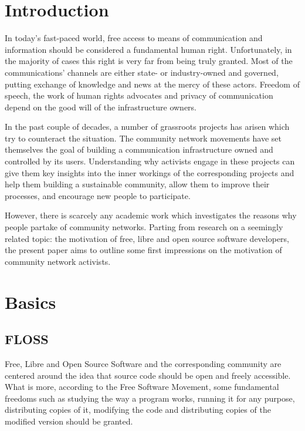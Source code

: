 \documentclass{scrartcl}
\begin{document}
\newpage
\section{Introduction}

In today's fast-paced world, free access to means of communication and information should be considered a fundamental human right.
Unfortunately, in the majority of cases this right is very far from being truly granted.
Most of the communications' channels are either state- or industry-owned and governed, putting exchange of knowledge and news at the mercy of these actors.
Freedom of speech, the work of human rights advocates and privacy of communication depend on the good will of the infrastructure owners.

In the past couple of decades, a number of grassroots projects has arisen which try to counteract the situation.
The community network movements have set themselves the goal of building a communication infrastructure owned and controlled by its users.
Understanding why activists engage in these projects can give them key insights into the inner workings of the corresponding projects and help them building a sustainable community, allow them to improve their processes, and encourage new people to participate.

However, there is scarcely any academic work which investigates the reasons why people partake of community networks.
Parting from research on a seemingly related topic: the motivation of free, libre and open source software developers, the present paper aims to outline some first impressions on the motivation of community network activists.


\section{Basics}
\subsection{FLOSS}
Free, Libre and Open Source Software and the corresponding community are centered around the idea that source code should be open and freely accessible.
What is more, according to the Free Software Movement,
some fundamental freedoms such as studying the way a program works, running it for any purpose, distributing copies of it, modifying the code and distributing copies of the modified version should be granted\cite{gnuweb}.
\end{document}
